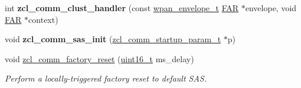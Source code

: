 \begin{DoxyCompactItemize}
\mbox{\label{group__zcl__commissioning_ga07258712d6ad21e9ddb96069bb08c896}} 
int {\bfseries zcl\+\_\+comm\+\_\+clust\+\_\+handler} (const \hyperlink{structwpan__envelope__t}{wpan\+\_\+envelope\+\_\+t} \hyperlink{group__hal_gaef060b3456fdcc093a7210a762d5f2ed}{F\+AR} $\ast$envelope, void \hyperlink{group__hal_gaef060b3456fdcc093a7210a762d5f2ed}{F\+AR} $\ast$context)
\item 
\mbox{\label{group__zcl__commissioning_gae85ac833a5eaf6f4a8cb6a5a9e6bb49e}} 
void {\bfseries zcl\+\_\+comm\+\_\+sas\+\_\+init} (\hyperlink{structzcl__comm__startup__param__t}{zcl\+\_\+comm\+\_\+startup\+\_\+param\+\_\+t} $\ast$p)
\item 
void \hyperlink{group__zcl__commissioning_ga1fb799391c7d917facd792d57e3db0fe}{zcl\+\_\+comm\+\_\+factory\+\_\+reset} (\hyperlink{group__hal__dos_ga5a8b2dc9e45a9ee81a94ef304fb62505}{uint16\+\_\+t} ms\+\_\+delay)
\begin{DoxyCompactList}\small\item\em Perform a locally-\/triggered factory reset to default S\+AS. \end{DoxyCompactList}\end{DoxyCompactItemize}
